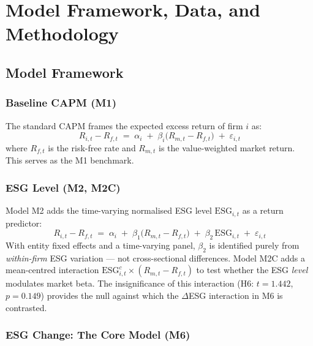 \chapter{Model Framework, Data, and Methodology}
\label{chap:framework}

\section{Model Framework}

\subsection{Baseline CAPM (M1)}

The standard CAPM frames the expected excess return of firm $i$ as:
\begin{equation}
  R_{i,t} - R_{f,t} \;=\; \alpha_i \;+\; \beta_i\bigl(R_{m,t} - R_{f,t}\bigr) \;+\; \varepsilon_{i,t}
  \label{eq:capm}
\end{equation}
where $R_{f,t}$ is the risk-free rate and $R_{m,t}$ is the value-weighted market return. This serves as the M1 benchmark.

\subsection{ESG Level (M2, M2C)}

Model M2 adds the time-varying normalised ESG level $\mathrm{ESG}_{i,t}$ as a return predictor:
\begin{equation}
  R_{i,t} - R_{f,t} \;=\; \alpha_i \;+\; \beta_1\bigl(R_{m,t}-R_{f,t}\bigr) \;+\; \beta_2\,\mathrm{ESG}_{i,t} \;+\; \varepsilon_{i,t}
  \label{eq:m2}
\end{equation}
With entity fixed effects and a time-varying panel, $\beta_2$ is identified purely from \emph{within-firm} ESG variation --- not cross-sectional differences. Model M2C adds a mean-centred interaction $\mathrm{ESG}_{i,t}^c \times (R_{m,t}-R_{f,t})$ to test whether the ESG \emph{level} modulates market beta. The insignificance of this interaction (H6: $t=1.442$, $p=0.149$) provides the null against which the $\Delta$ESG interaction in M6 is contrasted.

\subsection{ESG Change: The Core Model (M6)}


